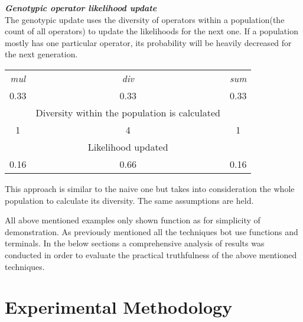 \documentclass[12pt]{article}
\begin{document}
\textbf{\textit{Genotypic operator likelihood update}}  \\
The genotypic update uses the diversity of operators within a population(the count of all operators) to update the likelihoods for the next one. If a population mostly has one particular operator,  its probability will be heavily decreased for the next generation.
\begin{center}
\begin{tabular}{ c c c }
 \textit{mul} & \textit{div} & \textit{sum} \\
 0.33 & 0.33 & 0.33 \\
   & Diversity within the population is  calculated &  \\
 1 & 4 & 1 \\
 & Likelihood updated &  \\
 0.16 & 0.66 & 0.16
\end{tabular}
\end{center}
This approach is similar to the naive one but takes into consideration the whole population to calculate its diversity. The same assumptions are held. \hfill
\break

All above mentioned examples only shown function as for simplicity of demonstration. As previously mentioned all the techniques bot use functions and terminals. In the below sections a comprehensive analysis of results was conducted in order to evaluate the practical truthfulness of the above mentioned techniques.

\section*{Experimental Methodology}
\end{document}
